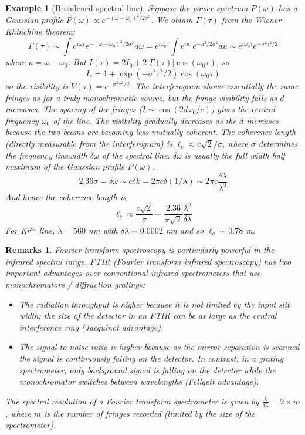 \documentclass[a4paper]{article}
\newtheorem{remarks}{Remarks}[section]
\newtheorem{eg}{Example}[section]
\theoremstyle{new}
\begin{document}
\begin{eg}[Broadened spectral line]
Suppose the power spectrum $P(\omega)$ has a Gaussian profile $P(\omega)\propto e^{-(\omega-\omega_0)^2/2\sigma^2}$. We obtain $\Gamma(\tau)$ from the Wiener-Khinchine theorem:
$$\Gamma(\tau)\sim \int e^{i\omega\tau}e^{-(\omega-\omega_0)^2/2\sigma^2}d\omega=e^{i\omega_0\tau}\int e^{iu\tau}e^{-u^2/2\sigma^2}du\sim e^{i\omega_0\tau}e^{-\sigma^2\tau^2/2}$$
where $u=\omega-\omega_0$. But $I(\tau)=2I_0+2|\Gamma(\tau)|\cos(\omega_0\tau)$, so
$$I_r=1+\exp(-\sigma^2\tau^2/2)\cos(\omega_0\tau)$$
so the visibility is $V(\tau)=e^{-\sigma^2\tau^2/2}$. The interferogram shows essentially the same fringes as for a truly monochromatic source, but the fringe visibility falls as $d$ increases. The spacing of the fringes ($I \sim\cos(2d\omega_0/c)$) gives the central frequency $\omega_0$ of the line. The visibility gradually decreases as the $d$ increases because the two beams are becoming less mutually coherent. The coherence length (directly measurable from the interferogram) is $\ell_c\approx c\sqrt{2}/\sigma$, where $\sigma$ determines the frequency linewidth $\delta\omega$ of the spectral line. $\delta\omega$ is usually the full width half maximum of the Gaussian profile $P(\omega)$.
$$2.36\sigma=\delta\omega\sim c\delta k=2\pi c\delta(1/\lambda)\sim 2\pi c\frac{\delta\lambda}{\lambda^2}$$
And hence the coherence length is
$$\ell_c\approx\frac{c\sqrt{2}}{\sigma}\sim\frac{2.36}{\pi\sqrt{2}}\frac{\lambda^2}{\delta\lambda}$$
For Kr$^{84}$ line, $\lambda=560$ nm with $\delta\lambda\sim 0.0002$ nm and so $\ell_c\sim 0.78$ m.
\end{eg}
\begin{remarks}
Fourier transform spectroscopy is particularly powerful in the infrared spectral range. FTIR (Fourier transform infrared spectroscopy) has two important advantages over conventional infrared spectrometers that use monochromators / diffraction gratings:
\begin{itemize}
    \item The radiation throughput is higher because it is not limited by the input slit width; the size of the detector in an FTIR can be as large as the central interference ring (Jacquinot advantage).
\item The signal-to-noise ratio is higher because as the mirror separation is scanned the signal is continuously falling on the detector. In contrast, in a grating spectrometer, only background signal is falling on the detector while the monochromator switches between wavelengths (Fellgett advantage).
\end{itemize}
The spectral resolution of a Fourier transform spectrometer is given by $\frac{\lambda}{\delta\lambda}=2\times m$, where $m$ is the number of fringes recorded (limited by the size of the spectrometer).
\end{remarks}
\end{document}
